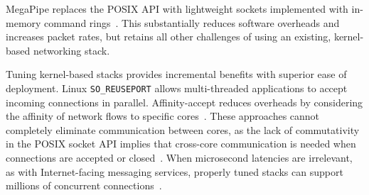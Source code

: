  MegaPipe replaces the POSIX
API with lightweight sockets implemented with in-memory command
rings~\cite{DBLP:conf/osdi/HanMCR12}. This substantially reduces software
overheads and increases packet rates, but retains all other challenges
of using an existing, kernel-based networking stack.

 Tuning kernel-based stacks provides
incremental benefits with superior ease of deployment.  Linux
\texttt{SO\_REUSEPORT} allows multi-threaded applications to accept
incoming connections in parallel. Affinity-accept reduces overheads by
considering the affinity of network flows to specific
cores~\cite{DBLP:conf/eurosys/PesterevSZM12}. These approaches cannot
completely eliminate communication between cores, as the lack of
commutativity in the POSIX socket API implies that cross-core
communication is needed when connections are accepted or
closed~\cite{DBLP:conf/sosp/ClementsKZMK13}. When microsecond
latencies are irrelevant, as with Internet-facing
messaging services, properly tuned stacks can support millions of
concurrent connections~\cite{whatsapp-2mil}.

